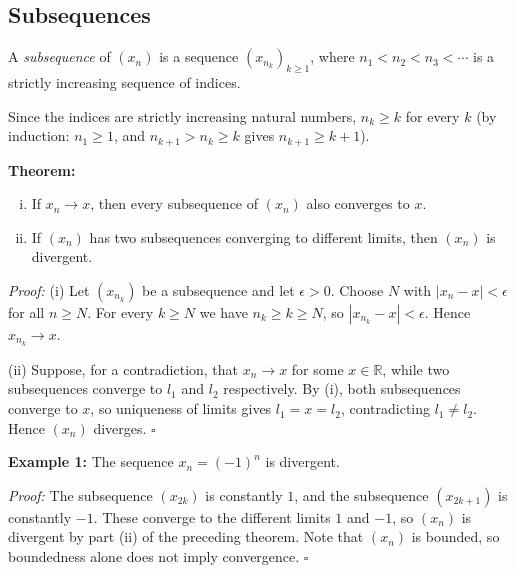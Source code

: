 \documentclass[a4paper,11pt,abstracton]{scrartcl}
\newcommand{\RR}{\mathbb{R}}
\theoremstyle{dotlessP}
\theoremstyle{dotlessS}
\theoremstyle{remark}
\theoremstyle{definition}
\begin{document}
\subsection{Subsequences}

\begin{definition_box}
A \emph{subsequence} of $(x_n)$ is a sequence $(x_{n_k})_{k\ge1}$, where $n_1<n_2<n_3<\cdots$ is a strictly increasing sequence of indices.
\end{definition_box}

Since the indices are strictly increasing natural numbers, $n_k\ge k$ for every $k$ (by induction: $n_1\ge1$, and $n_{k+1}>n_k\ge k$ gives $n_{k+1}\ge k+1$).

\begin{problem_box}
\textbf{Theorem:}
\begin{enumerate}[(i)]
    \item If $x_n\rightarrow x$, then every subsequence of $(x_n)$ also converges to $x$.
    \item If $(x_n)$ has two subsequences converging to different limits, then $(x_n)$ is divergent.
\end{enumerate}
\end{problem_box}

\begin{claim_box}
\textit{Proof:}
(i) Let $(x_{n_k})$ be a subsequence and let $\epsilon>0$. Choose $N$ with $|x_n-x|<\epsilon$ for all $n\ge N$. For every $k\ge N$ we have $n_k\ge k\ge N$, so $|x_{n_k}-x|<\epsilon$. Hence $x_{n_k}\rightarrow x$.

(ii) Suppose, for a contradiction, that $x_n\rightarrow x$ for some $x\in\RR$, while two subsequences converge to $l_1$ and $l_2$ respectively. By (i), both subsequences converge to $x$, so uniqueness of limits gives $l_1=x=l_2$, contradicting $l_1\ne l_2$. Hence $(x_n)$ diverges.
\hfill$\square$
\end{claim_box}

\begin{example_box}
\textbf{Example 1:} The sequence $x_n=(-1)^n$ is divergent.

\textit{Proof:}
The subsequence $(x_{2k})$ is constantly $1$, and the subsequence $(x_{2k+1})$ is constantly $-1$. These converge to the different limits $1$ and $-1$, so $(x_n)$ is divergent by part (ii) of the preceding theorem. Note that $(x_n)$ is bounded, so boundedness alone does not imply convergence.
\hfill$\square$
\end{example_box}
\end{document}
